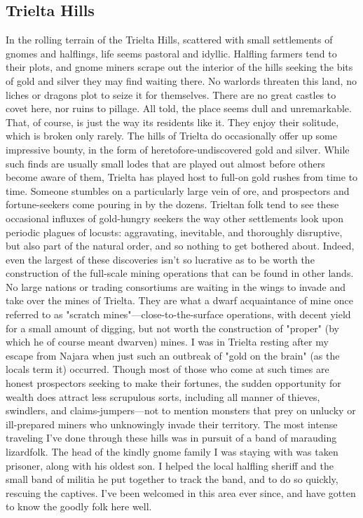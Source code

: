 \documentclass[10pt,a4paper,twoside,twocolumn,openany,bg=print,nodeprecatedcode]{dndbook}
\begin{document}
\subsection{Trielta Hills}
In the rolling terrain of the Trielta Hills, scattered with small settlements of gnomes and halflings, life seems pastoral and idyllic. Halfling farmers tend to their plots, and gnome miners scrape out the interior of the hills seeking the bits of gold and silver they may find waiting there. No warlords threaten this land, no liches or dragons plot to seize it for themselves. There are no great castles to covet here, nor ruins to pillage. All told, the place seems dull and unremarkable.
That, of course, is just the way its residents like it. They enjoy their solitude, which is broken only rarely. The hills of Trielta do occasionally offer up some impressive bounty, in the form of heretofore-undiscovered gold and silver. While such finds are usually small lodes that are played out almost before others become aware of them, Trielta has played host to full-on gold rushes from time to time. Someone stumbles on a particularly large vein of ore, and prospectors and fortune-seekers come pouring in by the dozens. Trieltan folk tend to see these occasional influxes of gold-hungry seekers the way other settlements look upon periodic plagues of locusts: aggravating, inevitable, and thoroughly disruptive, but also part of the natural order, and so nothing to get bothered about.
Indeed, even the largest of these discoveries isn't so lucrative as to be worth the construction of the full-scale mining operations that can be found in other lands. No large nations or trading consortiums are waiting in the wings to invade and take over the mines of Trielta. They are what a dwarf acquaintance of mine once referred to as "scratch mines"—close-to-the-surface operations, with decent yield for a small amount of digging, but not worth the construction of "proper" (by which he of course meant dwarven) mines.
I was in Trielta resting after my escape from Najara when just such an outbreak of "gold on the brain" (as the locals term it) occurred. Though most of those who come at such times are honest prospectors seeking to make their fortunes, the sudden opportunity for wealth does attract less scrupulous sorts, including all manner of thieves, swindlers, and claims-jumpers—not to mention monsters that prey on unlucky or ill-prepared miners who unknowingly invade their territory.
The most intense traveling I've done through these hills was in pursuit of a band of marauding lizardfolk. The head of the kindly gnome family I was staying with was taken prisoner, along with his oldest son. I helped the local halfling sheriff and the small band of militia he put together to track the band, and to do so quickly, rescuing the captives. I've been welcomed in this area ever since, and have gotten to know the goodly folk here well.
\end{document}
